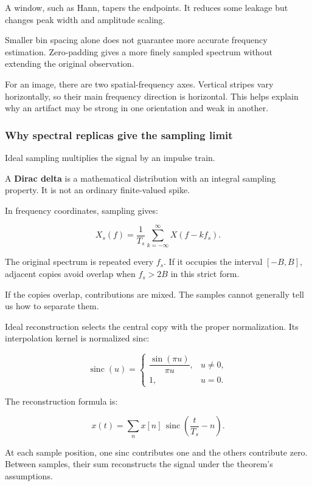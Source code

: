 A window, such as Hann, tapers the endpoints. It reduces some leakage but changes peak width and amplitude scaling.

Smaller bin spacing alone does not guarantee more accurate frequency estimation. Zero-padding gives a more finely sampled spectrum without extending the original observation.

For an image, there are two spatial-frequency axes. Vertical stripes vary horizontally, so their main frequency direction is horizontal. This helps explain why an artifact may be strong in one orientation and weak in another.

\subsubsection{Why spectral replicas give the sampling limit}\label{04-visual-computing-ii-ch042-why-spectral-replicas-give-the-sampling-limit}

\hypertarget{04-visual-computing-ii-ch042-why-spectral-replicas-give-the-sampling-limit}{}

Ideal sampling multiplies the signal by an impulse train.

A \textbf{Dirac delta} is a mathematical distribution with an integral sampling property. It is not an ordinary finite-valued spike.

In frequency coordinates, sampling gives:

\[
X_s(f)=\frac1{T_s}
\sum_{k=-\infty}^{\infty}X(f-kf_s).
\]

The original spectrum is repeated every \(f_s\). If it occupies the interval \([-B,B]\), adjacent copies avoid overlap when \(f_s>2B\) in this strict form.

If the copies overlap, contributions are mixed. The samples cannot generally tell us how to separate them.

Ideal reconstruction selects the central copy with the proper normalization. Its interpolation kernel is normalized sinc:

\[
\operatorname{sinc}(u)=
\begin{cases}
\dfrac{\sin(\pi u)}{\pi u},&u\ne0,\\
1,&u=0.
\end{cases}
\]

The reconstruction formula is:

\[
x(t)=\sum_n x[n]\,
\operatorname{sinc}\left(\frac{t}{T_s}-n\right).
\]

At each sample position, one sinc contributes one and the others contribute zero. Between samples, their sum reconstructs the signal under the theorem's assumptions.

